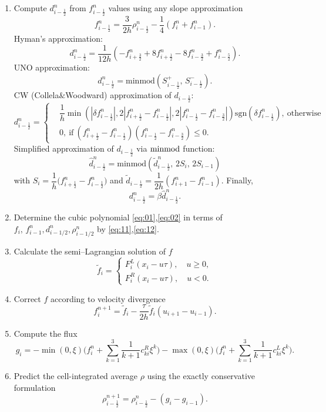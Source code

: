 \documentclass[10pt,a4paper]{article}
\newcommand{\minmod}[1]{\mathrm{minmod} #1} %
\newcommand{\sgn}[1]{\mathrm{sgn} #1} %
\begin{document}
\begin{enumerate}
\item Compute $d_{i-\frac{1}{2}}^n$ from $f_{i-\frac{1}{2}}^n$ values using any slope approximation
$$
f_{i-\frac{1}{2}}^n = \dfrac{3}{2h}\rho_{i-\frac{1}{2}}^n - \dfrac{1}{4}(f_i^n + f_{i-1}^n).
$$
Hyman's approximation:
$$
d_{i-\frac{1}{2}}^n = \dfrac{1}{12h} (-f_{i+\frac{3}{2}}^n + 8f_{i+\frac{1}{2}}^n - 8f_{i-\frac{3}{2}}^n + f_{i-\frac{5}{2}}^n).
$$
UNO approximation:
$$
d_{i-\frac{1}{2}}^n = \minmod (S_{i-\frac{1}{2}}^{+},\,S_{i-\frac{1}{2}}^{-}).
$$
%
CW (Collela$\&$Woodward) approximation of $d_{i-\frac{1}{2}}$:
$$
d_{i-\frac{1}{2}}^n =
\begin{cases}
&\dfrac{1}{h}\min(|\delta f_{i-\frac{1}{2}}^n|, 2|f_{i+\frac{1}{2}}^n - f_{i-\frac{1}{2}}^n|, 2|f_{i-\frac{1}{2}}^n - f_{i-\frac{3}{2}}^n|) \sgn(\delta f_{i-\frac{1}{2}}^n),~\text{otherwise} \\
&0,~\text{if}~(f_{i+\frac{1}{2}}^n-f_{i-\frac{1}{2}}^n)(f_{i-\frac{1}{2}}^n-f_{i-\frac{3}{2}}^n)\leqslant 0.
\end{cases}
$$
Simplified approximation of $d_{i-\frac{1}{2}}$ via $\minmod$ function:
$$
\hat{d}_{i-\frac{1}{2}}^n = \minmod(\tilde{d}_{i-\frac{1}{2}}^n,\,2S_i,\,2S_{i-1})
$$
with $S_{i}=\dfrac{1}{h}\biggl(f_{i+\frac{1}{2}}^n-f_{i-\frac{1}{2}}^n\biggr)$ and $\tilde{d}_{i-\frac{1}{2}} = \dfrac{1}{2h}(f_{i+1}^n-f_{i-1}^n)$. Finally,
$$
d_{i-\frac{1}{2}}^n = \beta \hat{d}_{i-\frac{1}{2}}^n.
$$

\item Determine the cubic polynomial \eqref{eq:01},\eqref{eq:02} in terms of $f_i,\,f_{i-1}^n,d_{i-1/2}^n,\rho_{i-1/2}^n$ by \eqref{eq:11},\eqref{eq:12}.
\item Calculate the semi--Lagrangian solution of $f$
$$
\tilde{f}_i = 
\begin{cases}
F_i^L(x_i - u\tau),\quad u\geqslant0, \\
F_i^R(x_i - u\tau),\quad u<0.
\end{cases}
$$
\item Correct $f$ according to velocity divergence
$$
f_i^{n+1} = \tilde{f}_i - \dfrac{\tau}{2h}\tilde{f}_i(u_{i+1}-u_{i-1}).
$$
\item Compute the flux 
$$
g_i = -\min(0,\xi)\biggl(f_i^n + \sum\limits_{k=1}^3 \frac{1}{k+1}c_{ki}^R\xi^k\biggr) -
    \max(0,\xi)\biggl(f_i^n + \sum\limits_{k=1}^3 \frac{1}{k+1}c_{ki}^L\xi^k\biggr).
$$
\item Predict the cell-integrated average $\rho$ using the exactly conservative formulation
$$
\rho_{i-\frac{1}{2}}^{n+1} = \rho_{i-\frac{1}{2}}^{n} - (g_i - g_{i-1}).
$$
\end{enumerate}
\end{document}

